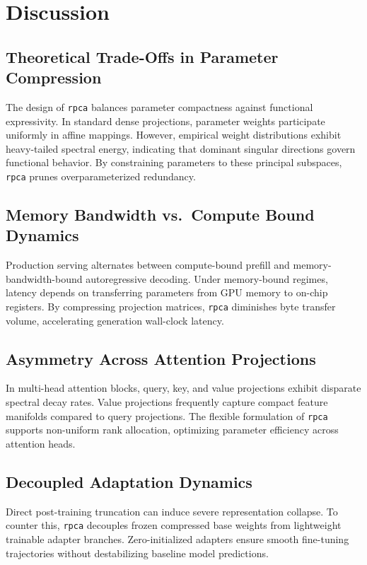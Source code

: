 \section{Discussion}

\subsection{Theoretical Trade-Offs in Parameter Compression}
The design of \texttt{rpca} balances parameter compactness against functional expressivity. In standard dense projections, parameter weights participate uniformly in affine mappings. However, empirical weight distributions exhibit heavy-tailed spectral energy, indicating that dominant singular directions govern functional behavior. By constraining parameters to these principal subspaces, \texttt{rpca} prunes overparameterized redundancy.

\subsection{Memory Bandwidth vs.\ Compute Bound Dynamics}
Production serving alternates between compute-bound prefill and memory-bandwidth-bound autoregressive decoding. Under memory-bound regimes, latency depends on transferring parameters from GPU memory to on-chip registers. By compressing projection matrices, \texttt{rpca} diminishes byte transfer volume, accelerating generation wall-clock latency.

\subsection{Asymmetry Across Attention Projections}
In multi-head attention blocks, query, key, and value projections exhibit disparate spectral decay rates. Value projections frequently capture compact feature manifolds compared to query projections. The flexible formulation of \texttt{rpca} supports non-uniform rank allocation, optimizing parameter efficiency across attention heads.

\subsection{Decoupled Adaptation Dynamics}
Direct post-training truncation can induce severe representation collapse. To counter this, \texttt{rpca} decouples frozen compressed base weights from lightweight trainable adapter branches. Zero-initialized adapters ensure smooth fine-tuning trajectories without destabilizing baseline model predictions.


